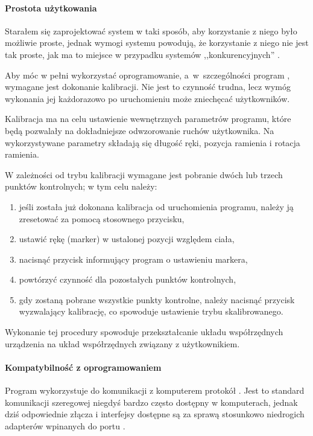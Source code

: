 
\paragraph{Prostota użytkowania}
Starałem się zaprojektować system w taki sposób, aby korzystanie z niego było możliwie proste, jednak wymogi systemu powodują, że korzystanie z niego nie jest tak proste, jak ma to miejsce w przypadku systemów ,,konkurencyjnych'' .

Aby móc w pełni wykorzystać oprogramowanie, a~w~szczególności program , wymagane jest dokonanie kalibracji. Nie jest to czynność trudna, lecz wymóg wykonania jej każdorazowo po uruchomieniu może zniechęcać użytkowników.

Kalibracja ma na celu ustawienie wewnętrznych parametrów programu, które będą pozwalały na dokładniejsze odwzorowanie ruchów użytkownika. Na wykorzystywane parametry składają się długość ręki, pozycja ramienia i rotacja ramienia.

W zależności od trybu kalibracji wymagane jest pobranie dwóch lub trzech punktów kontrolnych; w tym celu należy:
\begin{enumerate}
 \item jeśli została już dokonana kalibracja od uruchomienia programu, należy ją zresetować za pomocą stosownego przycisku,
 \item ustawić rękę (marker) w ustalonej pozycji względem ciała,
 \item nacisnąć przycisk informujący program o ustawieniu markera,
 \item powtórzyć czynność dla pozostałych punktów kontrolnych,
 \item gdy zostaną pobrane wszystkie punkty kontrolne, należy nacisnąć przycisk wyzwalający kalibrację, co spowoduje ustawienie trybu skalibrowanego.
\end{enumerate}

Wykonanie tej procedury spowoduje przekształcanie układu współrzędnych urządzenia na układ współrzędnych związany z użytkownikiem.

\paragraph{Kompatybilność z oprogramowaniem}
Program wykorzystuje do komunikacji z komputerem protokół . Jest to standard komunikacji szeregowej niegdyś bardzo często dostępny w komputerach, jednak dziś odpowiednie złącza i interfejsy dostępne są za sprawą stosunkowo niedrogich adapterów wpinanych do portu .

